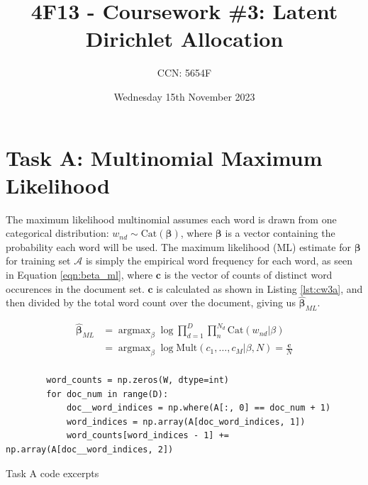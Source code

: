 \documentclass[11pt]{amsart}
\author{CCN: 5654F}
\title[4F13 - Coursework \#3: Latent Dirichlet Allocation]{\vspace*{-1.0cm}4F13 - Coursework \#3: Latent Dirichlet Allocation\vspace*{-0.5cm}}
\date{Wednesday 15th November 2023} %
\DeclareMathOperator*{\argmax}{argmax}
\begin{document}
\maketitle
\vspace*{-1cm}
\section{Task A: Multinomial Maximum Likelihood} \label{sec:a}
The maximum likelihood multinomial assumes each word is drawn from one categorical distribution: $w_{nd} \sim \mathrm{Cat}\left(\bm{\beta}\right)$, where $\bm{\beta}$ is a vector containing the probability each word will be used. The maximum likelihood (ML) estimate for $\bm{\beta}$ for training set $\mathcal{A}$ is simply the empirical word frequency for each word, as seen in Equation \ref{eqn:beta_ml}, where $\bm{c}$ is the vector of counts of distinct word occurences in the document set. $\bm{c}$ is calculated as shown in Listing \ref{lst:cw3a}, and then divided by the total word count over the document, giving us $\hat{\bm{\beta}}_{ML}$.

\vspace{-0.4cm}
\small
\begin{equation} \label{eqn:beta_ml}
    \begin{aligned}
        \hat{\bm{\beta}}_{ML} & = \argmax_{\beta}\log\prod_{d=1}^{D}\prod_{n}^{N_d}\mathrm{Cat}\left(w_{nd}\vert\beta\right)  \\
                              & = \argmax_{\beta}\log\mathrm{Mult}\left(c_1,\dots,c_M\vert\beta, N\right)  = \frac{\bm{c}}{N} \\
    \end{aligned}
\end{equation}
\normalsize

\begin{listing}[h]
    \begin{verbatim}
        word_counts = np.zeros(W, dtype=int)  
        for doc_num in range(D):
            doc__word_indices = np.where(A[:, 0] == doc_num + 1)
            word_indices = np.array(A[doc_word_indices, 1])
            word_counts[word_indices - 1] += np.array(A[doc__word_indices, 2])
    \end{verbatim}
    \caption{Task A code excerpts} \label{lst:cw3a}
\end{listing}
\end{document}
